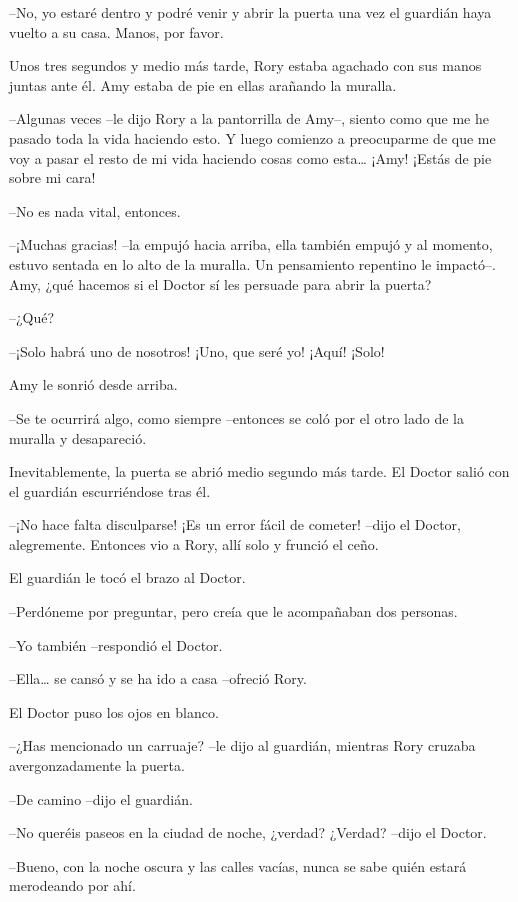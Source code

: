 {--No, yo estaré dentro y podré venir y abrir la puerta una vez el
guardián haya vuelto a su casa. Manos, por favor.}

{Unos tres segundos y medio más tarde, Rory estaba agachado con sus
manos juntas ante él. Amy estaba de pie en ellas arañando la muralla.}

{--Algunas veces --le dijo Rory a la pantorrilla de Amy--, siento como
	que me he pasado toda la vida haciendo esto. Y luego comienzo a
	preocuparme de que me voy a pasar el resto de mi vida haciendo cosas
	como esta\ldots{} ¡Amy! ¡Estás de pie sobre mi cara!}

{--No es nada vital, entonces.}

{--¡Muchas gracias! --la empujó hacia arriba, ella también empujó y al
	momento, estuvo sentada en lo alto de la muralla. Un pensamiento
	repentino le impactó--. Amy, ¿qué hacemos si el Doctor sí les persuade
para abrir la puerta?}

{--¿Qué?}

{--¡Solo habrá uno de nosotros! ¡Uno, que seré yo! ¡Aquí! ¡Solo!}

{Amy le sonrió desde arriba.}

{--Se te ocurrirá algo, como siempre --entonces se coló por el otro
lado de la muralla y desapareció.}

{Inevitablemente, la puerta se abrió medio segundo más tarde. El Doctor
salió con el guardián escurriéndose tras él.}

{--¡No hace falta disculparse! ¡Es un error fácil de cometer! --dijo
	el Doctor, alegremente. Entonces vio a Rory, allí solo y frunció el
ceño.}

{El guardián le tocó el brazo al Doctor.}

{--Perdóneme por preguntar, pero creía que le acompañaban dos
personas.}

{--Yo también --respondió el Doctor.}

{--Ella\ldots{} se cansó y se ha ido a casa --ofreció Rory.}

{El Doctor puso los ojos en blanco.}

{--¿Has mencionado un carruaje? --le dijo al guardián, mientras Rory
cruzaba avergonzadamente la puerta.}

{--De camino --dijo el guardián.}

{--No queréis paseos en la ciudad de noche, ¿verdad? ¿Verdad? --dijo
el Doctor.}

{--Bueno, con la noche oscura y las calles vacías, nunca se sabe quién
estará merodeando por ahí.}

